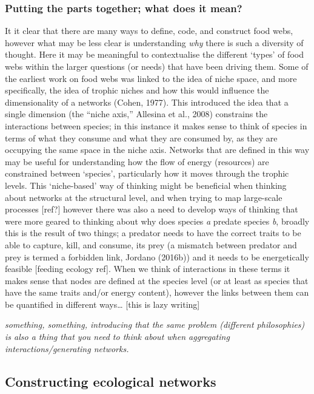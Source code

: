 \documentclass[
]{article}
\begin{document}
\subsubsection{Putting the parts together; what does it
mean?}\label{putting-the-parts-together-what-does-it-mean}

It it clear that there are many ways to define, code, and construct food
webs, however what may be less clear is understanding \emph{why} there
is such a diversity of thought. Here it may be meaningful to
contextualise the different `types' of food webs within the larger
questions (or needs) that have been driving them. Some of the earliest
work on food webs was linked to the idea of niche space, and more
specifically, the idea of trophic niches and how this would influence
the dimensionality of a networks (Cohen, 1977). This introduced the idea
that a single dimension (the ``niche axis,'' Allesina et al., 2008)
constrains the interactions between species; in this instance it makes
sense to think of species in terms of what they consume and what they
are consumed by, as they are occupying the same space in the niche axis.
Networks that are defined in this way may be useful for understanding
how the flow of energy (resources) are constrained between `species',
particularly how it moves through the trophic levels. This `niche-based'
way of thinking might be beneficial when thinking about networks at the
structural level, and when trying to map large-scale processes
{[}ref?{]} however there was also a need to develop ways of thinking
that were more geared to thinking about why does species \emph{a}
predate species \emph{b}, broadly this is the result of two things; a
predator needs to have the correct traits to be able to capture, kill,
and consume, its prey (a mismatch between predator and prey is termed a
forbidden link, Jordano (2016b)) and it needs to be energetically
feasible {[}feeding ecology ref{]}. When we think of interactions in
these terms it makes sense that nodes are defined at the species level
(or at least as species that have the same traits and/or energy
content), however the links between them can be quantified in different
ways\ldots{} {[}this is lazy writing{]}

\emph{something, something, introducing that the same problem (different
philosophies) is also a thing that you need to think about when
aggregating interactions/generating networks.}

\subsection{Constructing ecological
networks}\label{constructing-ecological-networks}
\end{document}
